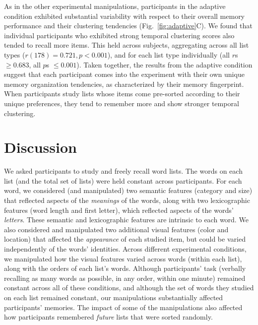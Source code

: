 \documentclass[11pt]{article}
\begin{document}
As in the other experimental manipulations, participants in the adaptive
condition exhibited substantial variability with respect to their overall
memory performance and their clustering tendencies (Fig.~\ref{fig:adaptive}C).
We found that individual participants who exhibited strong temporal clustering
scores also tended to recall more items. This held across subjects, aggregating
across all list types ($r(178) = 0.721, p < 0.001$), and for each list type
individually (all $r$s $\geq 0.683$, all $p$s $\leq 0.001$). Taken together,
the results from the adaptive condition suggest that each participant comes
into the experiment with their own unique memory organization tendencies, as
characterized by their memory fingerprint. When participants study lists whose
items come pre-sorted according to their unique preferences, they tend to remember
more and show stronger temporal clustering.

\section*{Discussion}


We asked participants to study and freely recall word lists. The words on each
list (and the total set of lists) were held constant across participants. For
each word, we considered (and manipulated) two semantic features (category and
size) that reflected aspects of the \textit{meanings} of the words, along with
two lexicographic features (word length and first letter), which reflected
aspects of the words' \textit{letters}. These semantic and lexicographic
features are intrinsic to each word. We also considered and manipulated two
additional visual features (color and location) that affected the
\textit{appearance} of each studied item, but could be varied independently of
the words' identities. Across different experimental conditions, we manipulated
how the visual features varied across words (within each list), along with the
orders of each list's words. Although participants' task (verbally recalling as
many words as possible, in any order, within one minute) remained constant
across all of these conditions, and although the set of words they studied on
each list remained constant, our manipulations substantially affected
participants' memories. The impact of some of the manipulations also affected
how participants remembered \textit{future} lists that were sorted randomly.

\end{document}
